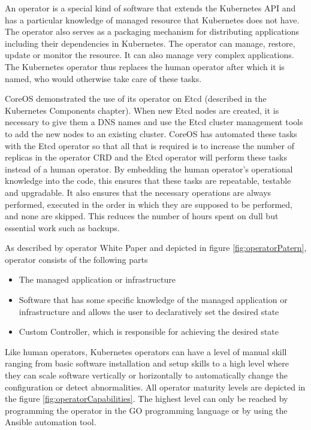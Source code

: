 An operator is a special kind of software that extends the Kubernetes API and has a particular knowledge of managed resource that Kubernetes does not have. The operator also serves as a packaging mechanism for distributing applications including their dependencies in Kubernetes. The operator can manage, restore, update or monitor the resource. It can also manage very complex applications. The Kubernetes operator thus replaces the human operator after which it is named, who would otherwise take care of these tasks. \cite{operatorsPreface} \cite{IArchiveCOSoperators}


CoreOS demonstrated the use of its operator on Etcd (described in the Kubernetes Components chapter). When new Etcd nodes are created, it is necessary to give them a DNS names and use the Etcd cluster management tools to add the new nodes to an existing cluster. CoreOS has automated these tasks with the Etcd operator so that all that is required is to increase the number of replicas in the operator CRD and the Etcd operator will perform these tasks instead of a human operator. \cite{IArchiveCOSoperators}
By embedding the human operator's operational knowledge into the code, this ensures that these tasks are repeatable, testable and upgradable. It also ensures that the necessary operations are always performed, executed in the order in which they are supposed to be performed, and none are skipped. This reduces the number of hours spent on dull but essential work such as backups. \cite{operatorWhitepaper}

As described by operator White Paper \cite{operatorWhitepaper} and depicted in figure \ref{fig:operatorPatern}, operator consists of the following parts
\begin{itemize}
    \item The managed application or infrastructure
    \item Software that has some specific knowledge of the managed application or infrastructure and allows the user to declaratively set the desired state
    \item Custom Controller, which is responsible for achieving the desired state
\end{itemize}


Like human operators, Kubernetes operators can have a level of manual skill ranging from basic software installation and setup skills to a high level where they can scale software vertically or horizontally to automatically change the configuration or detect abnormalities. All operator maturity levels are depicted in the figure \ref{fig:operatorCapabilities}. The highest level can only be reached by programming the operator in the GO programming language or by using the Ansible automation tool. \cite{operatorsOframework}

